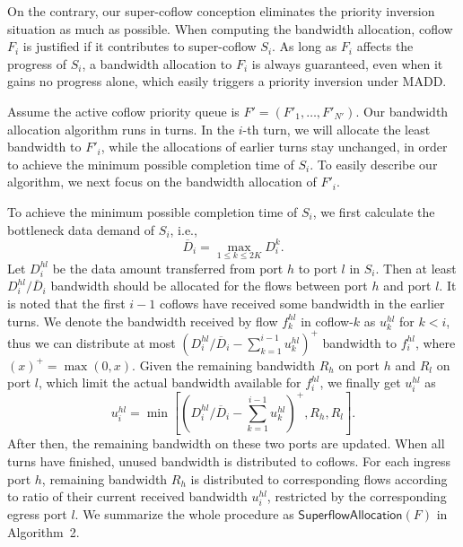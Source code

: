 \documentclass[10pt, conference, letterpaper]{IEEEtran}
\begin{document}
On the contrary, our super-coflow conception eliminates the priority inversion situation as much as possible. When computing the bandwidth allocation, coflow $F_i$ is justified if it contributes to super-coflow $S_i$. As long as $F_i$ affects the progress of $S_i$, a bandwidth allocation to $F_i$ is always guaranteed, even when it gains no progress alone, which easily triggers a priority inversion under MADD.

Assume the active coflow priority queue is $F'=(F'_1,\dots,F'_{N'})$. Our bandwidth allocation algorithm runs in turns. In the $i$-th turn, we will allocate the least bandwidth to $F'_i$, while the allocations of earlier turns stay unchanged,  in order to achieve the minimum possible completion time of $S_i$. To easily describe our algorithm, we next focus on the bandwidth allocation of $F'_i$.

To achieve the minimum possible completion time of $S_i$, we first calculate the bottleneck data demand of $S_i$, i.e.,
\begin{equation}
	\overline{D}_i = \max_{1\leq k\leq 2K}D_i^k.
\end{equation}
Let $D_i^{hl}$ be the data amount transferred from port $h$ to port $l$ in $S_i$. Then at least $D_i^{hl}/\overline{D}_i$ bandwidth should be allocated for the flows between port $h$ and port $l$. It is noted that the first $i-1$ coflows have received some bandwidth in the earlier turns. We denote the bandwidth received by flow $f_k^{hl}$ in coflow-$k$ as $u_k^{hl}$ for $k < i$, thus we can distribute at most $(D_i^{hl}/\overline{D}_i - \sum_{k=1}^{i-1}u_k^{hl})^+$ bandwidth to $f_i^{hl}$, where $(x)^+=\max(0,x)$. Given the remaining bandwidth $R_h$ on port $h$ and $R_l$ on port $l$, which limit the actual bandwidth available for $f_i^{hl}$, we finally get $u_i^{hl}$ as
\begin{equation}
	u_i^{hl} = \min[(D_i^{hl}/\overline{D}_i - \sum_{k=1}^{i-1}u_k^{hl})^+,R_h,R_l].
\end{equation}
After then, the remaining bandwidth on these two ports are updated. When all turns have finished, unused bandwidth is distributed to coflows. For each ingress port $h$, remaining bandwidth $R_h$ is distributed to corresponding flows according to ratio of their current received bandwidth $u_i^{hl}$, restricted by the corresponding egress port $l$. We summarize the whole procedure as $\mathsf{SuperflowAllocation}(F)$ in Algorithm~2.
\end{document}
